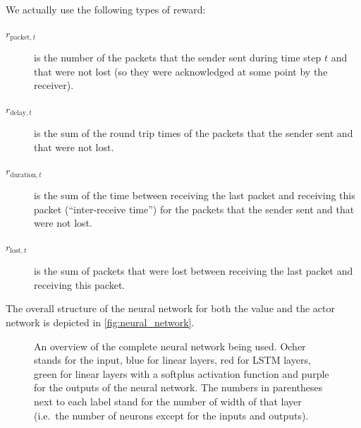 \documentclass[sigconf]{acmart}
\begin{document}
We actually use the following types of reward: 
\begin{description}
\item[$\textit{r}_{\text{packet},t}$] is the number of the packets that the sender sent during time step $t$ and that were not lost (so they were acknowledged at some point by the receiver).
\item[$\textit{r}_{\text{delay},t}$] is the sum of the round trip times of the packets that the sender sent and that were not lost.
\item[$\textit{r}_{\text{duration},t}$] is the sum of the time between receiving the last packet and receiving this packet (``inter-receive time'') for the packets that the sender sent and that were not lost.
\item[$\textit{r}_{\text{lost},t}$] is the sum of packets that were lost between receiving the last packet and receiving this packet.
\end{description}


The overall structure of the neural network for both the value and the actor network is depicted in \autoref{fig:neural_network}.

\begin{figure}



\caption{An overview of the complete neural network being used. Ocher stands for the input, blue for linear layers, red for LSTM layers, green for linear layers with a softplus activation function and purple for the outputs of the neural network. The numbers in parentheses next to each label stand for the number of width of that layer (i.e.~the number of neurons except for the inputs and outputs).}
\label{fig:neural_network}
\end{figure}
\end{document}
